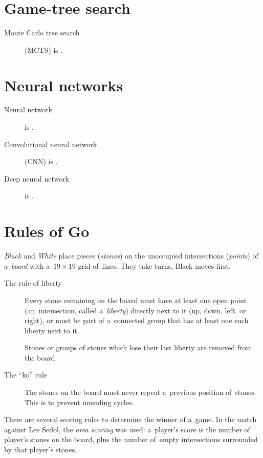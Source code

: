\documentclass[a4paper,10pt]{article}
\begin{document}
\section{Game-tree search}
\begin{description}
  \item [Monte Carlo tree search] (MCTS) is \todo.
\end{description}

\section{Neural networks}
\begin{description}
  \item [Neural network] is \todo.
  \item [Convolutional neural network] (CNN) is \todo.
  \item [Deep neural network] is \todo.
\end{description}

\section{Rules of Go}
\emph{Black} and \emph{White} place pieces (\emph{stones}) on the unoccupied intersections (\emph{points}) of a~\emph{board} with a~$19\times19$ grid of~lines.
They take turns, Black moves first.
\begin{description}
  \item [The rule of liberty]
    Every stone remaining on the board must have at least one open point (an~intersection, called a~\emph{liberty}) directly next to it (up, down, left, or right), or must be part of a~connected group that has at least one such liberty next to it.

    Stones or groups of stones which lose their last liberty are removed from the board.

  \item [The ``ko'' rule]
    The stones on the board must never repeat a~previous position of~stones.
    This is to prevent unending cycles.
\end{description}

There are several scoring rules to determine the winner of a~game.
In the match against Lee Sedol, the \emph{area scoring} was used:
a~player's score is the number of player's stones on the board, plus the number of~empty intersections surrounded by that player's stones.
\end{document}
